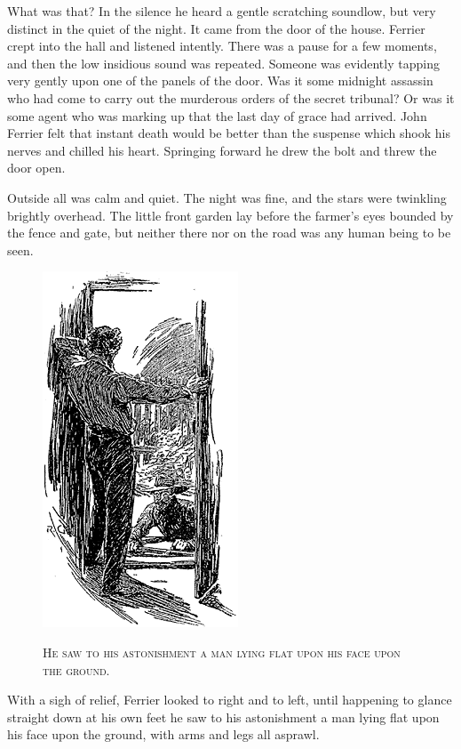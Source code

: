 \documentclass[12pt,english]{book}
\newcommand{\noun}[1]{\textsc{#1}}
\begin{document}
What was that? In the silence he heard a gentle scratching sound\mdsh{---}low,
but very distinct in the quiet of the night. It came from the door
of the house. Ferrier crept into the hall and listened intently. There
was a pause for a few moments, and then the low insidious sound was
repeated. Someone was evidently tapping very gently upon one of the
panels of the door. Was it some midnight assassin who had come to
carry out the murderous orders of the secret tribunal? Or was it some
agent who was marking up that the last day of grace had arrived. John
Ferrier felt that instant death would be better than the suspense
which shook his nerves and chilled his heart. Springing forward he
drew the bolt and threw the door open.

Outside all was calm and quiet. The night was fine, and the stars
were twinkling brightly overhead. The little front garden lay before
the farmer's eyes bounded by the fence and gate, but neither there
nor on the road was any human being to be seen. %
\begin{figure}[htbp]
\noindent \begin{center}\includegraphics{images/study10-stud-19.png}\end{center}

\noindent \begin{center}\noun{He saw to his astonishment a man lying
flat upon his face upon the ground.}\end{center}
\end{figure}
With a sigh of relief, Ferrier looked to right and to left, until
happening to glance straight down at his own feet he saw to his astonishment
a man lying flat upon his face upon the ground, with arms and legs
all asprawl.
\end{document}
